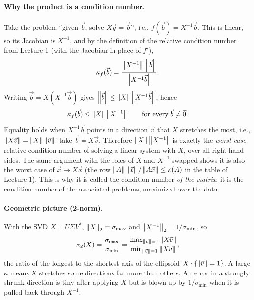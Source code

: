\begin{answer}
  \paragraph{Why the product is a condition number.} Take the problem ``given $\vec{b}$, solve $X\vec{y} = \vec{b}$'', i.e., $f(\vec{b}) = X^{-1}\vec{b}$. This is linear, so its Jacobian is $X^{-1}$, and by the definition of the relative condition number from Lecture 1 (with the Jacobian in place of $f'$),
  \begin{equation}
    \kappa_f(\vec{b}) = \frac{\left\lVert X^{-1} \right\rVert\,\left\lVert \vec{b} \right\rVert}{\left\lVert X^{-1}\vec{b} \right\rVert}.
  \end{equation}
  Writing $\vec{b} = X(X^{-1}\vec{b})$ gives $\left\lVert \vec{b} \right\rVert \le \left\lVert X \right\rVert\left\lVert X^{-1}\vec{b} \right\rVert$, hence
  \begin{equation}
    \kappa_f(\vec{b}) \le \left\lVert X \right\rVert\left\lVert X^{-1} \right\rVert \qquad \text{for every } \vec{b} \ne \vec{0}.
  \end{equation}
  Equality holds when $X^{-1}\vec{b}$ points in a direction $\vec{v}$ that $X$ stretches the most, i.e., $\left\lVert X\vec{v} \right\rVert = \left\lVert X \right\rVert\left\lVert \vec{v} \right\rVert$; take $\vec{b} = X\vec{v}$. Therefore $\left\lVert X \right\rVert\left\lVert X^{-1} \right\rVert$ is exactly the \emph{worst-case} relative condition number of solving a linear system with $X$, over all right-hand sides. The same argument with the roles of $X$ and $X^{-1}$ swapped shows it is also the worst case of $\vec{x} \mapsto X\vec{x}$ (the row $\left\lVert A \right\rVert\left\lVert \vec{x} \right\rVert/\left\lVert A\vec{x} \right\rVert \le \kappa(A)$ in the table of Lecture 1). This is why it is called the condition number \emph{of the matrix}: it is the condition number of the associated problems, maximized over the data.

  \paragraph{Geometric picture (2-norm).} With the SVD $X = U\Sigma V^\ast$, $\left\lVert X \right\rVert_2 = \sigma_{\max}$ and $\left\lVert X^{-1} \right\rVert_2 = 1/\sigma_{\min}$, so
  \begin{equation}
    \kappa_2(X) = \frac{\sigma_{\max}}{\sigma_{\min}} = \frac{\max_{\left\lVert \vec{v} \right\rVert = 1}\left\lVert X\vec{v} \right\rVert}{\min_{\left\lVert \vec{v} \right\rVert = 1}\left\lVert X\vec{v} \right\rVert},
  \end{equation}
  the ratio of the longest to the shortest axis of the ellipsoid $X \cdot \{\left\lVert \vec{v} \right\rVert = 1\}$. A large $\kappa$ means $X$ stretches some directions far more than others. An error in a strongly shrunk direction is tiny after applying $X$ but is blown up by $1/\sigma_{\min}$ when it is pulled back through $X^{-1}$.


\end{answer}
